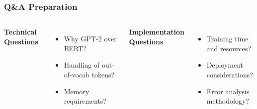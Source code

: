 \documentclass{beamer}
\begin{document}
\begin{frame}
\frametitle{Q\&A Preparation}
\begin{columns}
  \textbf{Technical Questions}
  \begin{itemize}
    \item Why GPT-2 over BERT?
    \item Handling of out-of-vocab tokens?
    \item Memory requirements?
  \end{itemize}

  \textbf{Implementation Questions}
  \begin{itemize}
    \item Training time and resources?
    \item Deployment considerations?
    \item Error analysis methodology?
  \end{itemize}
\end{columns}
\end{frame}
\end{document}
